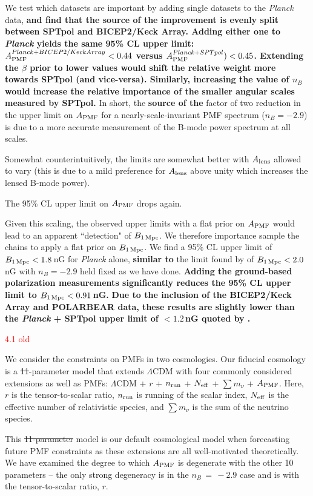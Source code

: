 \documentclass{article}
\newcommand{\apmf}{\ensuremath{A_{\rm PMF}}}
\newcommand{\bpmf}{\ensuremath{B_{\rm 1\,Mpc}}}
\newcommand{\alens}{\ensuremath{A_{\rm lens}}}
\newcommand{\lcdm}{\ensuremath{\Lambda}CDM}
\newcommand{\nrun}{\ensuremath{n_{\rm run}}}
\newcommand{\neff}{\ensuremath{N_{\rm eff}}}
\newcommand{\mnu}{\ensuremath{\sum m_\nu}}
\newcommand{\planck}{{\sl Planck}}
\newcommand{\bicepkeck}{BICEP2/Keck Array}
\newcommand{\sptpol}{SPTpol}
\newcommand{\changed}[1]{\textcolor{Red}{#1}}
\newcommand{\removed}[1]{\st{#1}}
\newcommand{\added}[1]{\textbf{#1}}
\begin{document}
{We test which datasets are important by adding single datasets to the \planck{} data, \added{and find that the source of the improvement is evenly split between \sptpol{} and \bicepkeck{}.
Adding either one to \planck{} yields the same 95\% CL upper limit: $\apmf^{\planck+\bicepkeck} <  \upperAbicep$ versus  $\apmf^{\planck+\sptpol}) < \upperAsptpol$. 
Extending the $\beta$ prior to lower values would shift the relative weight more towards \sptpol{} (and vice-versa). 
Similarly, increasing the value of $n_B$ would  increase the relative importance of the smaller angular scales measured by \sptpol.}
In short, the \added{source of the} factor of two reduction in the upper limit on \apmf{} for a nearly-scale-invariant PMF spectrum ($n_B=-2.9$) is due to a more accurate measurement of the B-mode power spectrum at all scales.

Somewhat counterintuitively, the limits are somewhat better with \alens{} allowed to vary (this is due to a mild preference for \alens{} above unity which increases the lensed B-mode power). 

The 95\% CL upper limit on \apmf{} drops again.

Given this scaling, the observed upper limits with a flat prior on \apmf{} would lead to an apparent ``detection" of \bpmf. 
We therefore importance sample the chains to apply a flat prior on \bpmf. 
We find a 95\% CL upper limit of $\bpmf < \upperBplk$\,nG for \planck{} alone,
\added{similar to} the limit found by \citet{planck15-19} of $\bpmf < 2.0$\,nG with $n_B=-2.9$ held fixed as we have done. 
\added{Adding the ground-based polarization measurements significantly reduces the 95\% CL upper limit to $\bpmf < \upperBall$\,nG. }
\added{Due to the inclusion of the \bicepkeck{} and POLARBEAR data, these results are slightly lower than the \planck{} + \sptpol{} upper limit of $<1.2\,$nG quoted by \citet{zucca16}.}

\changed{4.1 old}

We consider the constraints on PMFs in two cosmologies. 
Our fiducial cosmology is a \removed{11}-parameter model that extends \lcdm{} with  four  commonly considered extensions as well as PMFs:  \lcdm{} +  $r$ + \nrun{} +  \neff{} + \mnu{} + \apmf. 
Here, $r$ is the tensor-to-scalar ratio, \nrun{} is running of the scalar index, \neff{} is the effective number of relativistic species, and \mnu{} is the sum of the neutrino species. 

This \removed{11-parameter} model is our default cosmological model when forecasting future PMF constraints as these extensions are all well-motivated theoretically. 
We have examined the degree to which \apmf{} is degenerate with the other 10 parameters -- the only strong degeneracy is in the $n_B\,=\,-2.9$ case and is with the tensor-to-scalar ratio, $r$. 

}
\end{document}
